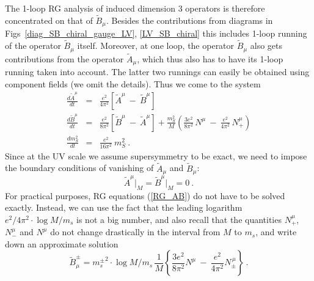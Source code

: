 \documentclass[12pt]{revtex4}
\begin{document}
	The 1-loop RG analysis of induced dimension 3 operators is therefore 
	concentrated on that of $ \widetilde{B}_\mu $.
	Besides the contributions from diagrams
	in Figs~\ref{diag_SB_chiral_gauge_LV}, \ref{LV_SB_chiral} this includes
	1-loop running of the operator $ \widetilde{B}_\mu $ itself.
	Moreover, at one loop, the operator $ \widetilde{B}_\mu $ also gets contributions
	from the operator $ \widetilde{A}_\mu $, which thus also has to have its
	1-loop running taken into account. 
	The latter two runnings can easily be obtained using component fields
	(we omit the details).
	Thus we come to the system
\begin{eqnarray}
\label{RG_AB}
\nonumber
        \frac{d \widetilde{A}^\mu}
                 {dt}               & = &
        \frac{e^2}{4\pi^2}  \left [    \widetilde{A}^\mu  ~-~ \widetilde{B}^\mu  \right ]
        \\
        \frac{d \widetilde{B}^\mu}
                 {dt}               & = &
        \frac{e^2}{8\pi^2}  \left [    \widetilde{B}^\mu  ~-~ \widetilde{A}^\mu  \right ] 
        +
        \frac{m_S^2}{M}
        \left (
                \frac{3e^2}
                    {8\pi^2}\, N^\mu 
                ~-~
                \frac{e^2}
                    {4\pi^2}\, N_+^\mu 
        \right )
        \\
\nonumber
        \frac{d m_S^2}
               {dt}                 & = &
        \frac{e^2}{16\pi^2}~ m_S^2~.
\end{eqnarray}
	Since at the UV scale we assume supersymmetry to be exact, we need to impose
	the boundary conditions of vanishing of $ \widetilde{A}_\mu $ and 
	$ \widetilde{B}_\mu $:
\[
        \widetilde{A}^\mu \Bigr|_M = \widetilde{B}^\mu \Bigr|_M = 0~.
\]  
	For practical purposes, RG equations (\ref{RG_AB}) do not have to be
	solved exactly. 
	Instead, we can use the fact that the leading logarithm
$ e^2/4\pi^2 \cdot \log M/m_s $
	is not a big number, and also recall that the quantities $ N_+^\mu $,
	$ N_-^\mu $ and $ N^\mu $ do not change drastically in the interval
	from $ M $ to $ m_{s} $, and write down an approximate solution
\begin{equation}
\label{B_mu_coef}
\widetilde{B}^\pm_\mu = 
{m_{s}^\pm}^2 \cdot \log M/m_s\,
\frac{1}{M}
\left \{ 
\frac{3e^2}
     {8\pi^2} N^\mu 
~-~
\frac{e^2}
     {4\pi^2} N_\pm^{\,\mu}
\right \}~.
\end{equation}
\end{document}
